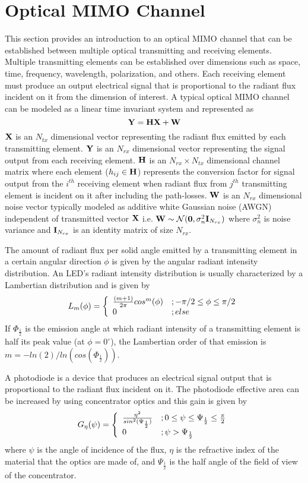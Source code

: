 \section{Optical MIMO Channel}\label{sec:mimo}
This section provides an introduction to an optical MIMO channel that can be established between multiple optical transmitting and receiving elements. Multiple transmitting elements can be established over dimensions such as space, time, frequency, wavelength, polarization, and others. Each receiving element must produce an output electrical signal that is proportional to the radiant flux incident on it from the dimension of interest. A typical optical MIMO channel can be modeled as a linear time invariant system and represented as
\begin{equation}
	\label{eqMIMOch}
	\vm{Y} = \vm{H}\vm{X} + \vm{W}
\end{equation}
${\bf{X}}$ is an $N_{tx}$ dimensional vector representing the radiant flux emitted by each transmitting element. ${\bf{Y}}$ is an $N_{rx}$ dimensional vector representing the signal output from each receiving element. ${\bf{H}}$ is an $N_{rx}\times N_{tx}$ dimensional channel matrix where each element ($h_{ij}\in {\bf{H}}$) represents the conversion factor for signal output from the $i^{th}$ receiving element when radiant flux from $j^{th}$ transmitting element is incident on it after including the path-losses. ${\bf{W}}$ is an $N_{rx}$ dimensional noise vector typically modeled as additive white Gaussian noise (AWGN) independent of transmitted vector ${\bf{X}}$ i.e. ${\bf{W}}\sim\mathcal{N}({\bf{0}},\sigma_n^2{\bf{I}}_{N_{rx}})$ where $\sigma_n^2$ is noise variance and ${\bf{I}}_{N_{rx}}$ is an identity matrix of size $N_{rx}$.

The amount of radiant flux per solid angle emitted by a transmitting element in a certain angular direction $\phi$ is given by the angular radiant intensity distribution. An LED's radiant intensity distribution is usually characterized by a Lambertian distribution and is given by
\begin{equation}
	\label{eqLamb}
	L_m(\phi) = \twopartdef{{\frac{(m+1)}{2\pi}}cos^{m}(\phi)}{-\pi/2\leq\phi\leq\pi/2}{0}{\mbox{ else}}
\end{equation}
If $\Phi_{\frac{1}{2}}$ is the emission angle at which radiant intensity of a transmitting element is half its peak value (at $\phi=0^\circ$), the Lambertian order of that emission is $m=-ln(2)/ln(cos(\Phi_{\frac{1}{2}}))$.

A photodiode is a device that produces an electrical signal output that is proportional to the radiant flux incident on it. The photodiode effective area can be increased by using concentrator optics and this gain is given by
\begin{equation}
	\label{eqGain}
	G_{\eta}(\psi) = \twopartdef{\frac{\eta^2}{sin^2(\Psi_{\frac{1}{2}})}} {0\leq\psi\leq\Psi_{\frac{1}{2}}\leq\frac{\pi}{2}}{0}{\psi>\Psi_{\frac{1}{2}}}
\end{equation}
where $\psi$ is the angle of incidence of the flux, $\eta$ is the refractive index of the material that the optics are made of, and $\Psi_{\frac{1}{2}}$ is the half angle of the field of view of the concentrator.

